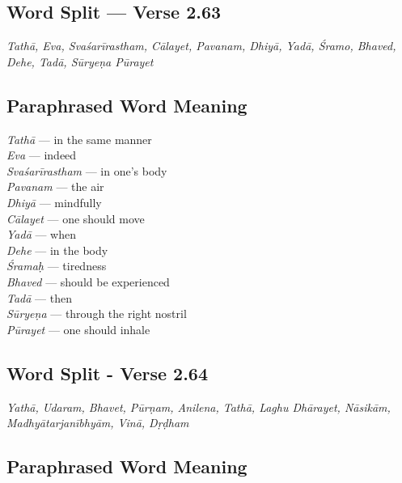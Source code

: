 \subsection*{Word Split --- Verse 2.63}


\textit{Tathā, Eva, Svaśarīrastham, Cālayet, Pavanam, Dhiyā, Yadā, Śramo, Bhaved, Dehe, Tadā, Sūryeṇa Pūrayet}

\subsection*{Paraphrased Word Meaning}

\begin{multicols}{2}
\textit{Tathā} --- in the same manner \\
\textit{Eva} --- indeed \\
\textit{Svaśarīrastham} --- in one’s body \\
\textit{Pavanam}  --- the air \\
\textit{Dhiyā} --- mindfully \\
\textit{Cālayet} --- one should move \\
\textit{Yadā} --- when \\
\textit{Dehe} --- in the body \\
\textit{Śramaḥ} --- tiredness \\
\textit{Bhaved}  --- should be experienced \\
\textit{Tadā} --- then\\
\textit{Sūryeṇa} --- through the right nostril \\
\textit{Pūrayet} --- one should inhale 
\end{multicols}

\subsection*{Word Split - Verse 2.64}

\textit{Yathā, Udaram, Bhavet, Pūrṇam, Anilena, Tathā, Laghu Dhārayet, Nāsikām, Madhyātarjanībhyām, Vinā, Dṛḍham}


\subsection*{Paraphrased Word Meaning}


